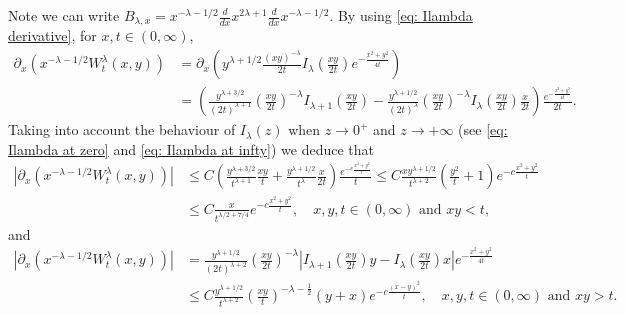 \documentclass[a4paper,10pt, reqno]{amsart}
\theoremstyle{definition}
\theoremstyle{remark}
\numberwithin{equation}{section}
\begin{document}
Note we can write $B_{\lambda, x}=x^{-\lambda -1/2}\frac{d}{dx}x^{2\lambda +1}\frac{d}{dx}x^{-\lambda -1/2}$. 
By using \eqref{eq: Ilambda derivative}, for $x,t\in (0,\infty)$,
\begin{align*}
    \partial_x\left(x^{-\lambda -1/2}W_t^\lambda (x,y)\right)&=\partial_x \left(y^{\lambda+1/2}\frac{(xy)^{-\lambda }}{2t}I_\lambda \left(\frac{xy}{2t}\right)e^{-\frac{x^2+y^2}{4t}}\right)\\
    &=\left(\frac{y^{\lambda +3/2}}{(2t)^{\lambda +1}}\left(\frac{xy}{2t}\right)^{-\lambda }I_{\lambda +1}\left(\frac{xy}{2t}\right)-\frac{y^{\lambda+1/2}}{(2t)^\lambda }\left(\frac{xy}{2t}\right)^{-\lambda }I_\lambda \left(\frac{xy}{2t}\right)\frac{x}{2t}\right)\frac{e^{-\frac{x^2+y^2}{4t}}}{2t}.
\end{align*}
Taking into account the behaviour of $I_\lambda (z)$ when $z\rightarrow 0^+$ and $z\rightarrow +\infty$ (see \eqref{eq: Ilambda at zero} and \eqref{eq: Ilambda at infty}) we deduce that
\begin{align*}
    \left|\partial_x\left(x^{-\lambda -1/2}W_t^\lambda (x,y)\right)\right|&\leq C\left(\frac{y^{\lambda +3/2}}{t^{\lambda +1}}\frac{xy}{t}+\frac{y^{\lambda+1/2}}{t^\lambda }\frac{x}{2t}\right)\frac{e^{-c\frac{x^2+y^2}{t}}}{t}\leq C\frac{xy^{\lambda+1/2}}{t^{\lambda +2}}\left(\frac{y^2}{t}+1\right)e^{-c\frac{x^2+y^2}{t}}\\
    &\leq C\frac{x}{t^{\lambda /2+7/4}}e^{-c\frac{x^2+y^2}{t}},\quad x,y,t\in (0,\infty) \mbox{ and }xy<t,
\end{align*}
and
\begin{align*}
    \left|\partial_x\left(x^{-\lambda -1/2}W_t^\lambda (x,y)\right)\right|&=\frac{y^{\lambda+1/2}}{(2t)^{\lambda +2}}\left(\frac{xy}{2t}\right)^{-\lambda }\left|I_{\lambda +1}\left(\frac{xy}{2t}\right)y-I_\lambda \left(\frac{xy}{2t}\right)x\right|e^{-\frac{x^2+y^2}{4t}}\\
    &\leq C\frac{y^{\lambda+1/2}}{t^{\lambda +2}}\left(\frac{xy}{t}\right)^{-\lambda -\tfrac12}(y+x)e^{-c\frac{(x-y)^2}{t}},\quad x,y,t\in (0,\infty) \mbox{ and }xy>t.
\end{align*}
\end{document}
